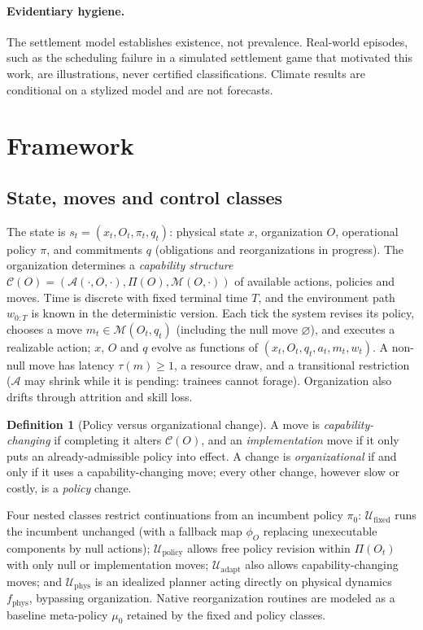 \documentclass[11pt]{article}
\theoremstyle{plain}
\theoremstyle{definition}
\newtheorem{definition}{Definition}
\newcommand{\U}{\mathcal{U}}
\newcommand{\M}{\mathcal{M}}
\newcommand{\A}{\mathcal{A}}
\newcommand{\CapStr}{\mathcal{C}}
\newcommand{\fixed}{\mathrm{fixed}}
\newcommand{\policy}{\mathrm{policy}}
\newcommand{\adapt}{\mathrm{adapt}}
\newcommand{\phys}{\mathrm{phys}}
\begin{document}
\paragraph{Evidentiary hygiene.} The settlement model establishes existence, not prevalence. Real-world episodes, such as the scheduling failure in a simulated settlement game that motivated this work, are illustrations, never certified classifications. Climate results are conditional on a stylized model and are not forecasts.

\section{Framework}
\label{sec:framework}

\subsection{State, moves and control classes}

The state is $s_t=(x_t,O_t,\pi_t,q_t)$: physical state $x$, organization $O$, operational policy $\pi$, and commitments $q$ (obligations and reorganizations in progress). The organization determines a \emph{capability structure} $\CapStr(O)=(\A(\cdot,O,\cdot),\Pi(O),\M(O,\cdot))$ of available actions, policies and moves. Time is discrete with fixed terminal time $T$, and the environment path $w_{0:T}$ is known in the deterministic version. Each tick the system revises its policy, chooses a move $m_t\in\M(O_t,q_t)$ (including the null move $\varnothing$), and executes a realizable action; $x$, $O$ and $q$ evolve as functions of $(x_t,O_t,q_t,a_t,m_t,w_t)$. A non-null move has latency $\tau(m)\ge1$, a resource draw, and a transitional restriction ($\A$ may shrink while it is pending: trainees cannot forage). Organization also drifts through attrition and skill loss.

\begin{definition}[Policy versus organizational change]
A move is \emph{capability-changing} if completing it alters $\CapStr(O)$, and an \emph{implementation} move if it only puts an already-admissible policy into effect. A change is \emph{organizational} if and only if it uses a capability-changing move; every other change, however slow or costly, is a \emph{policy} change.
\end{definition}

Four nested classes restrict continuations from an incumbent policy $\pi_0$: $\U_\fixed$ runs the incumbent unchanged (with a fallback map $\phi_O$ replacing unexecutable components by null actions); $\U_\policy$ allows free policy revision within $\Pi(O_t)$ with only null or implementation moves; $\U_\adapt$ also allows capability-changing moves; and $\U_\phys$ is an idealized planner acting directly on physical dynamics $f_\phys$, bypassing organization. Native reorganization routines are modeled as a baseline meta-policy $\mu_0$ retained by the fixed and policy classes.
\end{document}
